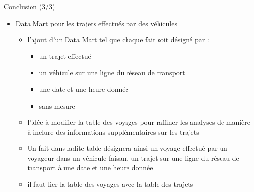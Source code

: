 \documentclass[usenames,dvipsnames]{beamer}
\begin{document}
\begin{frame}{Conclusion (3/3)}
\begin{itemize}
    \item Data Mart pour les trajets effectués par des véhicules
        \begin{itemize}
        \item 	l’ajout d’un Data Mart tel que chaque fait soit désigné par :
                \begin{itemize}
                \item un trajet effectué 
                \item un véhicule sur une ligne du réseau de transport 
                \item une date et une heure donnée
                \item sans mesure
                \end{itemize}
        \item	l’idée à modifier la table des voyages pour raffiner les analyses de manière à inclure des informations supplémentaires sur les trajets
        \item 	Un fait dans ladite table désignera ainsi un voyage effectué par un voyageur dans un véhicule faisant un trajet sur une ligne du réseau de transport à une date et une heure donnée
        \item 	il faut lier la table des voyages avec la table des trajets 
        \end{itemize}
\end{itemize}
\end{frame}
\end{document}
